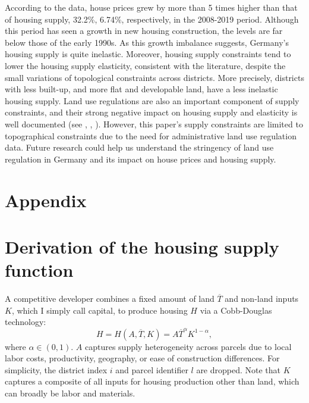 \documentclass[
  12pt,
]{article}
\begin{document}
According to the data, house prices grew by more than 5 times higher than that of housing supply, 32.2\%, 6.74\%, respectively, in the 2008-2019 period. Although this period has seen a growth in new housing construction, the levels are far below those of the early 1990s. As this growth imbalance suggests, Germany's housing supply is quite inelastic. Moreover, housing supply constraints tend to lower the housing supply elasticity, consistent with the literature, despite the small variations of topological constraints across districts. More precisely, districts with less built-up, and more flat and developable land, have a less inelastic housing supply. Land use regulations are also an important component of supply constraints, and their strong negative impact on housing supply and elasticity is well documented (see \citet{glaeser-gyourko2005}, \citet{saiz2010}, \citet{baumsnow-han2019}). However, this paper's supply constraints are limited to topographical constraints due to the need for administrative land use regulation data. Future research could help us understand the stringency of land use regulation in Germany and its impact on house prices and housing supply.

\newpage


\nocite{bbsr2021}
  

\newpage

\section*{Appendix}\label{appendix}

\appendix


\renewcommand\theequation{\thesection.\arabic{equation}}    
\setcounter{equation}{0}

\renewcommand\thefigure{\thesection.\arabic{figure}}    
\setcounter{figure}{0}

\renewcommand\thetable{\thesection.\arabic{table}}    
\setcounter{table}{0}

\section{Derivation of the housing supply function}\label{supplyapp}

A competitive developer combines a fixed amount of land \(\overline{T}\) and non-land inputs \(K\), which I simply call capital, to produce housing \(H\) via a Cobb-Douglas technology: \begin{equation}
  H = H(A, \overline{T}, K) = A \overline{T}^{\alpha} K^{1-\alpha}\label{eq:app-cobb},
\end{equation} where \(\alpha \in (0, 1)\). \(A\) captures supply heterogeneity across parcels due to local labor costs, productivity, geography, or ease of construction differences. For simplicity, the district index \(i\) and parcel identifier \(l\) are dropped. Note that \(K\) captures a composite of all inputs for housing production other than land, which can broadly be labor and materials.
\end{document}
